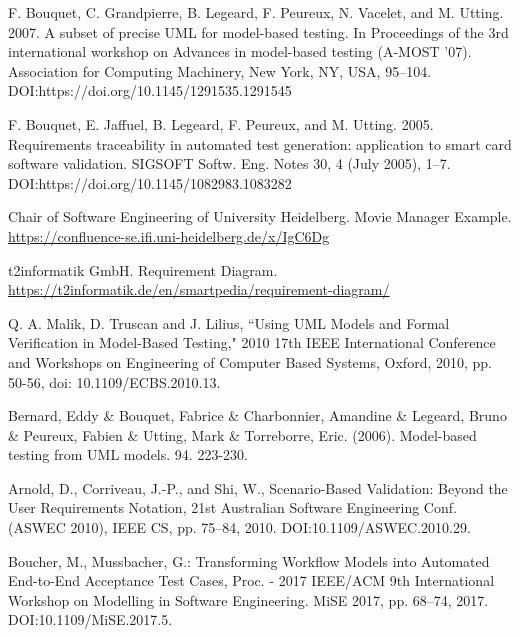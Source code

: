 \documentclass[a4paper,10pt, bibliography=totocnumbered]{scrreprt}
\begin{document}
\begin{thebibliography}{9}
 F. Bouquet, C. Grandpierre, B. Legeard, F. Peureux, N. Vacelet, and M. Utting. 2007. A subset of precise UML for model-based testing. In Proceedings of the 3rd international workshop on Advances in model-based testing (A-MOST '07). Association for Computing Machinery, New York, NY, USA, 95–104. DOI:https://doi.org/10.1145/1291535.1291545

F. Bouquet, E. Jaffuel, B. Legeard, F. Peureux, and M. Utting. 2005. Requirements traceability in automated test generation: application to smart card software validation. SIGSOFT Softw. Eng. Notes 30, 4 (July 2005), 1–7. DOI:https://doi.org/10.1145/1082983.1083282

Chair of Software Engineering of University Heidelberg. Movie Manager Example. 
\url{https://confluence-se.ifi.uni-heidelberg.de/x/IgC6Dg} 

t2informatik GmbH. Requirement Diagram.
\url{https://t2informatik.de/en/smartpedia/requirement-diagram/} 

Q. A. Malik, D. Truscan and J. Lilius, “Using UML Models and Formal Verification in Model-Based Testing," 2010 17th IEEE International Conference and Workshops on Engineering of Computer Based Systems, Oxford, 2010, pp. 50-56, doi: 10.1109/ECBS.2010.13.

Bernard, Eddy \& Bouquet, Fabrice \& Charbonnier, Amandine \& Legeard, Bruno \& Peureux, Fabien \& Utting, Mark \& Torreborre, Eric. (2006). Model-based testing from UML models. 94. 223-230. 





 Arnold, D., Corriveau, J.-P., and Shi, W., Scenario-Based Validation: Beyond the User Requirements Notation, 21st Australian Software Engineering Conf. (ASWEC 2010), IEEE CS, pp. 75–84, 2010. DOI:10.1109/ASWEC.2010.29.

 Boucher, M., Mussbacher, G.: Transforming Workflow Models into Automated End-to-End Acceptance Test Cases, Proc. - 2017 IEEE/ACM 9th International Workshop on Modelling in Software Engineering. MiSE 2017, pp. 68–74, 2017. DOI:10.1109/MiSE.2017.5.



\end{thebibliography}

\listoffigures

\listoftables
\end{document}
